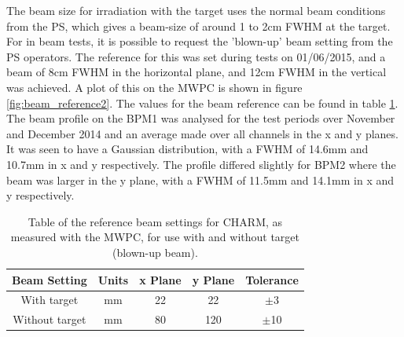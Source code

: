 The beam size for irradiation with the target uses the normal beam conditions from the PS, which gives a beam-size of around 1 to 2cm FWHM at the target. For in beam tests, it is possible to request the 'blown-up' beam setting from the PS operators. The reference for this was set during tests on 01/06/2015, and a beam of 8cm FWHM in the horizontal plane, and 12cm FWHM in the vertical was achieved. A plot of this on the MWPC is shown in figure \ref{fig:beam_reference2}. The values for the beam reference can be found in table \ref{tab:mwpc_reference_values}. \\

The beam profile on the BPM1 was analysed for the test periods over November and December 2014 and an average made over all channels in the x and y planes. It was seen to have a Gaussian distribution, with a FWHM of 14.6mm and 10.7mm in x and y respectively. The profile differed slightly for BPM2 where the beam was larger in the y plane, with a FWHM of 11.5mm and 14.1mm in x and y respectively. \\

\begin{table}[!ht]
\begin{center}
	\begin{tabular}{c|c|c|c|c}
	\textbf{Beam Setting} & \textbf{Units} & \textbf{x Plane} & \textbf{y Plane} & \textbf{Tolerance} \\ 
	\hline 
	\hline 
	With target			& mm	& 22	& 22	& $\pm$3 \\ 
	Without target		& mm	& 80	& 120	& $\pm$10 \\ 
	\end{tabular}
\caption{Table of the reference beam settings for CHARM, as measured with the MWPC, for use with and without target (blown-up beam).}
\label{tab:mwpc_reference_values}%
\end{center}
\end{table}

